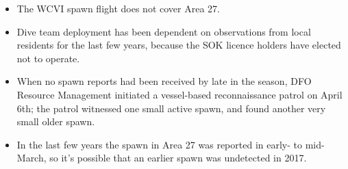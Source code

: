 \begin{itemize}
\item The WCVI spawn flight does not cover Area 27.
\item Dive team deployment has been dependent on observations from local residents for the last few years, because the SOK licence holders have elected not to operate.
\item When no spawn reports had been received by late in the season, DFO Resource Management initiated a vessel-based reconnaissance patrol on April 6th; the patrol witnessed one small active spawn, and found another very small older spawn.
\item In the last few years the spawn in Area 27 was reported in early- to mid-March, so it's possible that an earlier spawn was undetected in 2017.
\end{itemize}